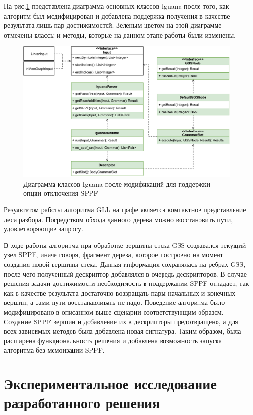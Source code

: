 \documentclass[14pt]{matmex-diploma-custom}
\theoremstyle{definition}
\begin{document}
На рис.\ref{fig:sppf} представлена диаграмма основных классов Iguana после того, как алгоритм был модифицирован и добавлена поддержка получения в качестве результата лишь пар достижимостей. Зеленым цветом на этой диаграмме отмечены классы и методы, которые на данном этапе работы были изменены.
\begin{figure}[H]
\centering
\includegraphics[width=\textwidth]{pics/sppf.pdf}
\caption{Диаграмма классов Iguana после модификаций для поддержки опции отключения SPPF}
\label{fig:sppf}
\end{figure}

Результатом работы алгоритма GLL на графе является компактное представление леса разбора.
Посредством обхода данного дерева можно восстановить пути, удовлетворяющие запросу.

В ходе работы алгоритма при обработке вершины стека GSS создавался текущий узел SPPF, иначе говоря, фрагмент дерева, которое построено на момент создания новой вершины стека. Данная информация сохранялась на ребрах GSS, после чего полученный дескриптор добавлялся в очередь дескрипторов.
В случае решения задачи достижимости необходимость в поддержании SPPF отпадает, так как в качестве результата достаточно возвращать пары начальных и конечных вершин, а сами пути восстанавливать не надо. Поведение алгоритма было модифицировано в описанном выше сценарии соответствующим образом. Создание SPPF вершин и добавление их в дескрипторы предотвращено, а для всех зависимых методов была добавлена новая сигнатура.
Таким образом,  была расширена функциональность решения и добавлена возможность запуска алгоритма без мемоизации SPPF.

\section{Экспериментальное исследование разработанного решения}
    
\end{document}
